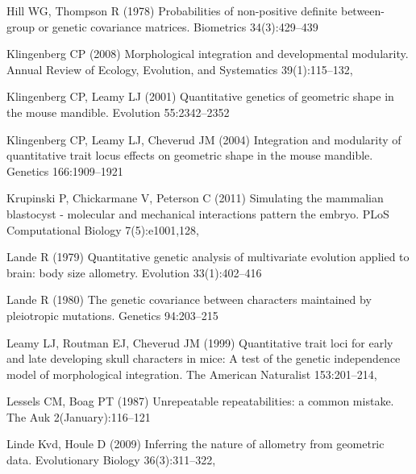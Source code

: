 \documentclass [twocolumn, natbib, nospthms, 10pt] {svjour3}
\begin{document}
\begin{thebibliography}{77}
Hill WG, Thompson R (1978) Probabilities of non-positive definite between-group
  or genetic covariance matrices. Biometrics 34(3):429–439

Klingenberg CP (2008) Morphological integration and developmental modularity.
  Annual Review of Ecology, Evolution, and Systematics 39(1):115–132,

Klingenberg CP, Leamy LJ (2001) Quantitative genetics of geometric shape in the
  mouse mandible. Evolution 55:2342–2352

Klingenberg CP, Leamy LJ, Cheverud JM (2004) Integration and modularity of
  quantitative trait locus effects on geometric shape in the mouse mandible.
  Genetics 166:1909–1921

Krupinski P, Chickarmane V, Peterson C (2011) Simulating the mammalian
  blastocyst - molecular and mechanical interactions pattern the embryo. {PLoS}
  Computational Biology 7(5):e1001,128, 

Lande R (1979) Quantitative genetic analysis of multivariate evolution applied
  to brain: body size allometry. Evolution 33(1):402–416

Lande R (1980) The genetic covariance between characters maintained by
  pleiotropic mutations. Genetics 94:203–215

Leamy LJ, Routman EJ, Cheverud JM (1999) Quantitative trait loci for early and
  late developing skull characters in mice: A test of the genetic independence
  model of morphological integration. The American Naturalist 153:201–214,

Lessels CM, Boag PT (1987) Unrepeatable repeatabilities: a common mistake. The
  Auk 2(January):116–121

Linde Kvd, Houle D (2009) Inferring the nature of allometry from geometric
  data. Evolutionary Biology 36(3):311--322, 


\end{thebibliography}
\end{document}
